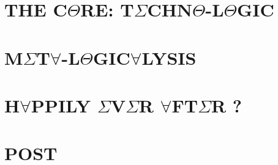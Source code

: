 \documentclass{thesis} %
\begin{document}
\part{\texorpdfstring{THE C$\Theta$RE: T$\Sigma$CHN$\Theta$-L$\Theta$GIC}{THE CORE: TECHNO-LOGIC}}




\part{\texorpdfstring{M$\Sigma$T$\forall$-L$\Theta$GIC$\forall$LYSIS}{META-LOGICALYSIS}}



\part{\texorpdfstring{H$\forall$PPILY $\Sigma$V$\Sigma$R $\forall$FT$\Sigma$R ?}{HAPPILY EVER AFTER ?}}



\appendix

\part*{\texorpdfstring{POST\frownie{}}{POSTFACE}}

% 
% 
% 
\clearpage

\pagestyle{plain}
{}
\clearpage

{}
\printnoidxglossary
\clearpage
\end{document}
